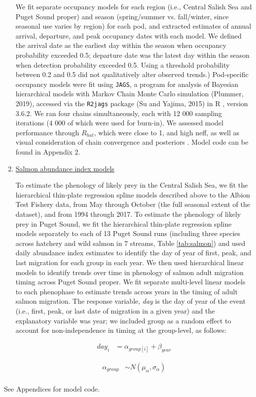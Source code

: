 \documentclass{article}
\begin{document}
\begin{enumerate}
 
\par We fit separate occupancy models for each region (i.e., Central Salish Sea and Puget Sound proper) and season (spring/summer vs. fall/winter, since seasonal use varies by region) for each pod, and extracted estimates of annual arrival, departure, and peak occupancy dates with each model. We defined the arrival date as the earliest day within the season when occupancy probability exceeded 0.5; departure date was the latest day within the season when detection probability exceeded 0.5. Using a threshold probability between 0.2 and 0.5 did not qualitatively alter observed trends.) Pod-specific occupancy models were fit using \texttt{JAGS}, a program for analysis of Bayesian hierarchical models with Markov Chain Monte Carlo simulation (Plummer, 2019), accessed via the \texttt{R2jags} package (Su and Yajima, 2015) in R \citep{Rcore2019}, version 3.6.2. We ran four chains simultaneously, each with 12 000 sampling iterations (4 000 of which were used for burn-in). We assessed model performance through $R_{hat}$, which were close to 1, and high neff, as well as visual consideration of chain convergence and posteriors \citep{BDA}. Model code can be found in Appendix 2.
\item \underline {Salmon abundance index models}
\par To estimate the phenology of likely prey in the Central Salish Sea, we fit the hierarchical thin-plate regression spline models described above to the Albion Test Fishery data, from May through October (the full seasonal extent of the dataset), and from 1994 through 2017. To estimate the phenology of likely prey in Puget Sound, we fit the hierarchical thin-plate regression spline models separately to each of 13 Puget Sound runs (including three species across hatchery and wild salmon in 7 streams, Table \ref{tab:salmon}) and used daily abundance index estimates to identify the day of year of first, peak, and last migration for each group in each year. We then used hierarchical linear models to identify trends over time in phenology of salmon adult migration timing across Puget Sound proper.  We fit  separate multi-level linear models to each phenophase to estimate trends across years in the timing of adult salmon migration. The response variable, \emph{day} is the day of year of the event (i.e., first, peak, or last date of migration in a given year) and the explanatory variable was year; we included group as a random effect to account for non-independence in timing at the group-level, as follows:

\begin{align*}
day_i &= \alpha_{group[i]} + \beta_{year}
\end{align*}

\begin{align*}
\alpha_{group} & \sim N(\mu_{\alpha}, \sigma_{\alpha}) \\
\end{align*}

\end{enumerate}
See Appendices for model code.
\end{document}
